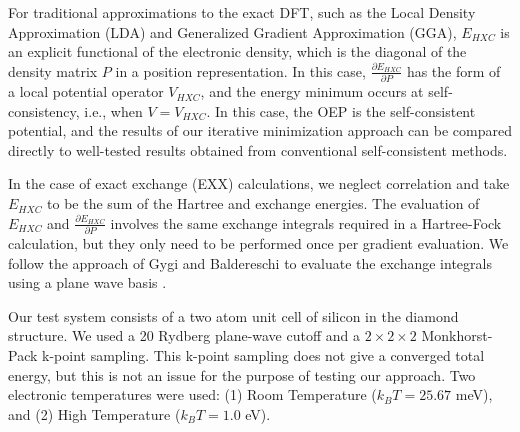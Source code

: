 \documentclass[12pt]{iopart}
\newcommand{\Vscp}{V}
\newcommand{\dens}{P}
\begin{document}
For traditional approximations to the exact DFT,
such as the Local Density Approximation (LDA) and Generalized Gradient Approximation (GGA),
$E_{HXC}$ is an explicit functional of the electronic density, which is the diagonal of
the density matrix $\dens$ in a position representation.  In this case,
$\frac{\partial E_{HXC}}{\partial \dens}$ has the form of a local potential operator $V_{HXC}$,
and the energy minimum occurs at self-consistency, i.e., when $\Vscp = V_{HXC}$.
In this case, the OEP is the self-consistent potential, and the results of our iterative
minimization approach can be compared directly to well-tested results obtained from
conventional self-consistent methods.

In the case of exact exchange (EXX) calculations, we neglect correlation and take $E_{HXC}$
to be the sum of the Hartree and exchange energies.  The evaluation of $E_{HXC}$ and
$\frac{\partial E_{HXC}}{\partial \dens}$ involves the same exchange integrals required
in a Hartree-Fock calculation, but they only need to be performed once per gradient evaluation.
We follow the approach of Gygi and Baldereschi to evaluate
the exchange integrals using a plane wave basis \cite{GygiBaldereschi:86}.

Our test system consists of a two atom unit cell of silicon in the diamond structure.  We used a
20 Rydberg plane-wave cutoff and a $2 \times 2 \times 2$ Monkhorst-Pack k-point sampling.
This k-point sampling does not give a converged total energy, but this is not an issue for
the purpose of testing our approach.  Two electronic temperatures were used: (1) Room Temperature
($k_B T = 25.67$ meV), and (2) High Temperature ($k_B T = 1.0$ eV).
\end{document}
